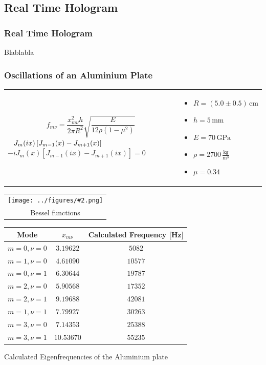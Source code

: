 \documentclass{beamer}
\newcommand{\gra}[3][]{
	\begin{table}
	\centering
	\begin{tabular}[width=\textwidth]{c}
		\texttt{[image: ../figures/\#2.png]}\\
		\small #3
	\end{tabular}
	\end{table}
}
\begin{document}
\subsection{Real Time Hologram}
\frame{\tableofcontents[currentsubsection]}
\begin{frame}
	\frametitle{Real Time Hologram}
	Blablabla
\end{frame}
\begin{frame}
	\frametitle{Oscillations of an Aluminium Plate}	
\begin{table}
	\centering
	\begin{tabular}{p{6cm}p{4cm}}
	
	$$f_{m\nu}=\frac{x_{m\nu}^2h}{2\pi R^2}\sqrt{\frac{E}{12\rho(1-\mu^2)}}$$\newline
	${\color{white}{-}}J_m(ix)\left[ J_{m-1}(x) - J_{m+1}(x)  \right]$ \newline $- iJ_m(x)\left[ J_{m-1}(ix) - J_{m+1}(ix)  \right] = 0$
		&
	\begin{itemize}
		\item $ R = (5.0\pm0.5)\,\mathrm{cm}$
		\item $h=5\,\mathrm{mm}$
		\item $E=70\,\mathrm{GPa}$
		\item $\rho = 2700\,\frac{\mathrm{kg}}{\mathrm{m^3}}$
		\item $\mu = 0.34$ 
	\end{itemize}
	\end{tabular}
\end{table}
\end{frame}
\begin{frame}
	\gra[0.8]{bessel_2}{Bessel functions \footnotemark{}}
\end{frame}

\begin{frame}
\begin{table}[h]
	\centering
	\begin{tabular}{c|c|c}
		Mode 		& $x_{m\nu}$ & Calculated Frequency [Hz] 	 \\ \hline\hline
		$m=0,\nu=0$	&$3.19622$   &$5082$						\\ \hline
		$m=1,\nu=0$	& $4.61090$  & $10577$					\\ \hline
		$m=0,\nu=1$	& $6.30644$  & $19787$					\\ \hline
		$m=2,\nu=0$	& $5.90568$  & $17352$					\\ \hline
		$m=2,\nu=1$	& $9.19688$  & $42081$					\\ \hline
		$m=1,\nu=1$	& $7.79927$  & $30263$				     \\ \hline
		$m=3,\nu=0$	& $7.14353$  & $25388$                \\ \hline
		$m=3,\nu=1$	& $10.53670$ & $55235$
	\end{tabular} \vskip 0.2cm
	{Calculated Eigenfrequencies of the Aluminium plate}
\end{table}	
\end{frame}
\end{document}
